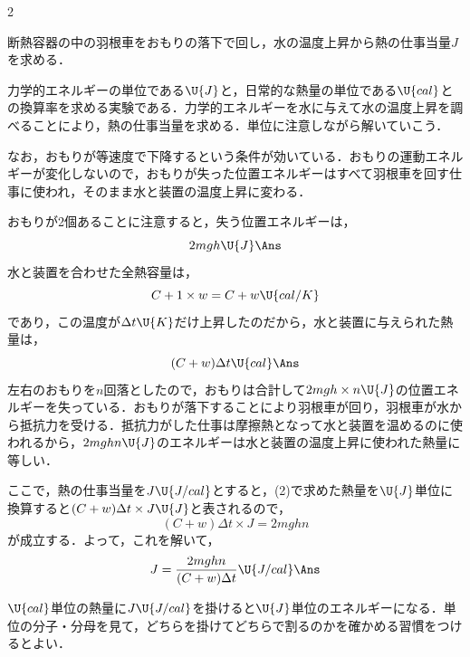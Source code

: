 \begin{multicols}{2}
\begin{kaitou}
\end{kaitou}
\begin{saikei}
断熱容器の中の羽根車をおもりの落下で回し，水の温度上昇から熱の仕事当量$J$を求める．
\end{saikei}
\begin{sisin}
力学的エネルギーの単位である$\U{J}$と，日常的な熱量の単位である$\U{cal}$との換算率を求める実験である．力学的エネルギーを水に与えて水の温度上昇を調べることにより，熱の仕事当量を求める．単位に注意しながら解いていこう．

なお，おもりが{\gtfamily 等速度で}下降するという条件が効いている．おもりの運動エネルギーが変化しないので，おもりが失った位置エネルギーはすべて羽根車を回す仕事に使われ，そのまま水と装置の温度上昇に変わる．
\end{sisin}
\begin{kaitou}
\begin{komon}
 おもりが2個あることに注意すると，失う位置エネルギーは，
       \[2mgh\U{J}\Ans\]
 水と装置を合わせた全熱容量は，
       \[C+1\times w=C+w\U{cal/K}\]
       であり，この温度が$\Delta t\U{K}$だけ上昇したのだから，水と装置に与えられた熱量は，
       \[(C+w)\Delta t\U{cal}\Ans\]
 左右のおもりを$n$回落としたので，おもりは合計して$2mgh\times n\U{J}$の位置エネルギーを失っている．おもりが落下することにより羽根車が回り，羽根車が水から抵抗力を受ける．抵抗力がした仕事は摩擦熱となって水と装置を温めるのに使われるから，$2mghn\U{J}$のエネルギーは水と装置の温度上昇に使われた熱量に等しい．\par
       \hspace{1zw}ここで，熱の仕事当量を$J\U{J/cal}$とすると，(2)で求めた熱量を$\U{J}$単位に換算すると$(C+w)\Delta t\times J\U{J}$と表されるので，
       \[(C+w)\Delta t\times J=2mghn\]
       が成立する．よって，これを解いて，
       \[J=\frac{2mghn}{(C+w)\Delta t}\U{J/cal}\Ans\]
\end{komon}
\end{kaitou}
\begin{chuu}
\hspace{1zw}$\U{cal}$単位の熱量に$J\U{J/cal}$を掛けると$\U{J}$単位のエネルギーになる．単位の分子・分母を見て，どちらを掛けてどちらで割るのかを確かめる習慣をつけるとよい．
\end{chuu}


\end{multicols}
